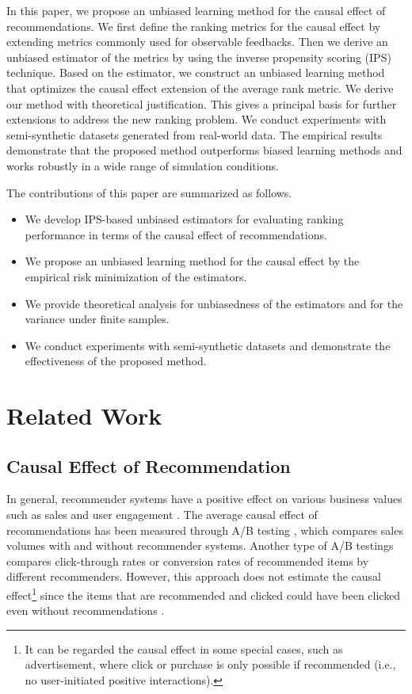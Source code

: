 \documentclass[manuscript,screen]{acmart}
\begin{document}
In this paper, we propose an unbiased learning method for the causal effect of recommendations. 
We first define the ranking metrics for the causal effect by extending metrics commonly used for observable feedbacks.
Then we derive an unbiased estimator of the metrics by using the inverse propensity scoring (IPS) \cite{Hirano03,Lunceford04} technique.
Based on the estimator, we construct an unbiased learning method that optimizes the causal effect extension of the average rank metric.
We derive our method with theoretical justification.
This gives a principal basis for further extensions to address the new ranking problem.
We conduct experiments with semi-synthetic datasets generated from real-world data.
The empirical results demonstrate that the proposed method outperforms biased learning methods and works robustly in a wide range of simulation conditions.

The contributions of this paper are summarized as follows.
\begin{itemize}
	\item We develop IPS-based unbiased estimators for evaluating ranking performance in terms of the causal effect of recommendations.
	\item We propose an unbiased learning method for the causal effect by the empirical risk minimization of the estimators.
	\item We provide theoretical analysis for unbiasedness of the estimators and for the variance under finite samples.
	\item We conduct experiments with semi-synthetic datasets and demonstrate the effectiveness of the proposed method.
\end{itemize}

\section{Related Work}
\subsection{Causal Effect of Recommendation}
In general, recommender systems have a positive effect on various business values such as sales and user engagement \cite{Jannach19}.
The average causal effect of recommendations has been measured through A/B testing \cite{Dias08, Lee14}, which compares sales volumes with and without recommender systems.
Another type of A/B testings compares click-through rates or conversion rates of recommended items by different recommenders.
However, this approach does not estimate the causal effect\footnote{It can be regarded the causal effect in some special cases, such as advertisement, where click or purchase is only possible if recommended (i.e., no user-initiated positive interactions).} since the items that are recommended and clicked could have been clicked even without recommendations \cite{Sharma15}.
\end{document}
